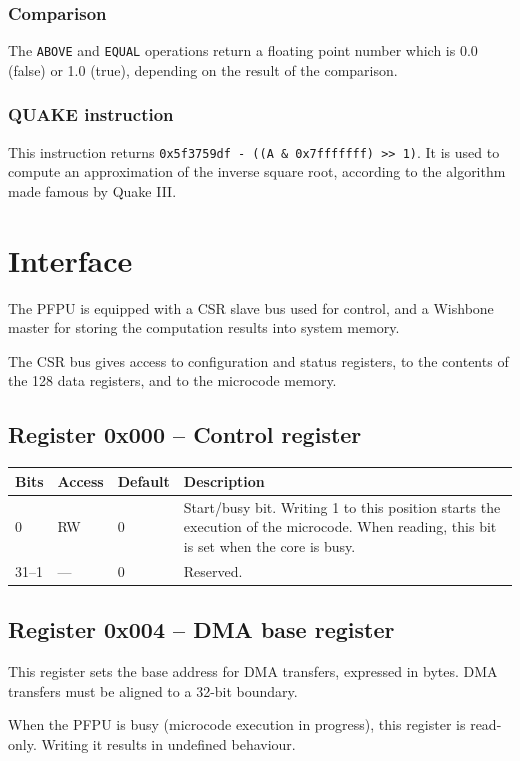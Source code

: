 \documentclass[a4paper,11pt]{article}
\begin{document}
\subsubsection{Comparison}
The \verb!ABOVE! and \verb!EQUAL! operations return a floating point number which is 0.0 (false) or 1.0 (true), depending on the result of the comparison.

\subsubsection{QUAKE instruction}
This instruction returns \verb!0x5f3759df - ((A & 0x7fffffff) >> 1)!. It is used to compute an approximation of the inverse square root, according to the algorithm made famous by Quake III.

\section{Interface}
The PFPU is equipped with a CSR slave bus used for control, and a Wishbone master for storing the computation results into system memory.

The CSR bus gives access to configuration and status registers, to the contents of the 128 data registers, and to the microcode memory.

\subsection{Register 0x000 -- Control register}
\begin{tabularx}{\textwidth}{|l|l|l|X|}
\hline
\bf Bits & \bf Access & \bf Default & \bf Description \\
\hline
0 & RW & 0 & Start/busy bit. Writing 1 to this position starts the execution of the microcode. When reading, this bit is set when the core is busy. \\
\hline
31--1 & --- & 0 & Reserved. \\
\hline
\end{tabularx}

\subsection{Register 0x004 -- DMA base register}
This register sets the base address for DMA transfers, expressed in bytes. DMA transfers must be aligned to a 32-bit boundary.

When the PFPU is busy (microcode execution in progress), this register is read-only. Writing it results in undefined behaviour.
\end{document}
